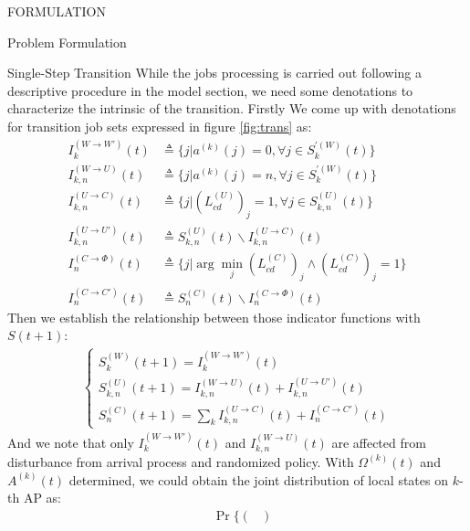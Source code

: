 \documentclass[10pt, conference, letterpaper]{IEEEtran}
\begin{document}
\begin{section}{FORMULATION}
\begin{subsection}{Problem Formulation}
\begin{subsubsection}{Single-Step Transition}
                While the jobs processing is carried out following a descriptive procedure in the model section, we need some denotations to characterize the intrinsic of the transition. Firstly We come up with denotations for transition job sets expressed in figure \ref{fig:trans} as:
                \begin{align}
                    I^{(W \to W')}_{k}(t) & \triangleq \{ j | a^{(k)}(j)=0, \forall j \in S^{'(W)}_k(t)\}
                    \\
                    I^{(W \to U)}_{k,n}(t) &\triangleq \{ j | a^{(k)}(j)=n, \forall j \in S^{'(W)}_k(t)\}
                    \\
                    I^{(U \to C)}_{k,n}(t) &\triangleq \{j|(L^{(U)}_{cd})_j=1, \forall j \in S^{(U)}_{k,n}(t)\}
                    \\
                    I^{(U \to U')}_{k,n}(t) &\triangleq S^{(U)}_{k,n}(t) \backslash I^{(U \to C)}_{k,n}(t)
                    \\
                    I^{(C \to \Phi)}_{n}(t) &\triangleq \{j|\arg\min_{j} (L^{(C)}_{cd})_j \wedge (L^{(C)}_{cd})_j=1\}
                    \\
                    I^{(C \to C')}_{n}(t) &\triangleq S^{(C)}_{n}(t) \backslash I^{(C \to \Phi)}_{n}(t)
                \end{align}
                Then we establish the relationship between those indicator functions with $S(t+1)$:
                \begin{align}
                    \begin{cases}
                        S^{(W)}_{k}(t+1) = I^{(W \to W')}_{k}(t)
                        \\
                        S^{(U)}_{k,n}(t+1) = I^{(W \to U)}_{k,n}(t) + I^{(U \to U')}_{k,n}(t)
                        \\
                        S^{(C)}_{n}(t+1) = \sum_k I^{(U \to C)}_{k,n}(t) + I^{(C \to C')}_{n}(t)
                    \end{cases}
                \end{align}
                And we note that only $I^{(W \to W')}_{k}(t)$ and $I^{(W \to U)}_{k,n}(t)$ are affected from disturbance from arrival process and randomized policy. With $\Omega^{(k)}(t)$ and $A^{(k)}(t)$ determined, we could obtain the joint distribution of local states on $k$-th AP as:
                \begin{align}
                    & \Pr\{\begin{pmatrix}

\end{pmatrix}
\end{align}
\end{subsubsection}
\end{subsection}
\end{section}
\end{document}
